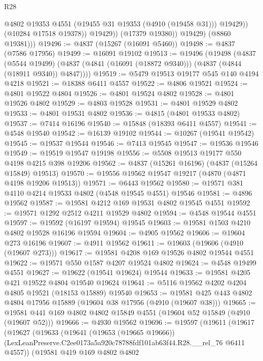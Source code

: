 \begin{lexlean}{R28}
\begin{coremodule}
                      @4802
                      @19353
                      @4551
                      (@19455 @31 @19353 (@4910 (@19458 @31)))
                      @19429))
                  (@10284 @17518 @19378))
                @19429))
            (@17379 @19380))
          @19429)
        (@8860 @19381)))
@19496 := @4837 (@15267 (@16091 @5460))
@19498 := @4837 (@7586 @17956)
@19499 := @16091 @19102
@19513 := @19496
    (@19498
      (@4837
        (@5544 @19499)
        (@4837 (@4841 (@16091 (@18872 @9340))) (@4837 (@4844 (@18911 @9340)) @4847))))
@19519 := @5479 @19513 @19177 @545 @140 @4194 @4218
@19521 := @18388 @6411 @4557
@19522 := @4806 @19521
@19524 := @4801 @19522 @4804
@19526 := @4801 @19524 @4802
@19528 := @4801 @19526 @4802
@19529 := @4803 @19528
@19531 := @4801 @19529 @4802
@19533 := @4801 @19531 @4802
@19536 := @4815 (@4801 @19533 @4802)
@19537 := @7414 @16196
@19540 := @15848 (@18393 @6411 @4557)
@19541 := @4548 @19540
@19542 := @16139 @19102
@19544 := @10267 (@19541 @19542)
@19545 := @19537 @19544
@19546 := @7413 @19545
@19547 := @19536 @19546
@19549 := @19519 @19547 @19198
@19556 := @5508 @19513 @19177 @550 @4198 @4215 @398 @19206
@19562 := @4837 (@15261 @16196) (@4837 (@15264 @15849) @19513)
@19570 := @19556 @19562 @19547 @19217 (@4870 (@4871 @4198 @19206 @19513))
@19571 := @6443 @19562
@19580 := @19571 @381 @4110 @4214 @19533 @4802 (@4548 @19545 @4551) @19546
@19581 := @4896 @19562
@19587 := @19581 @4212 @169 @19531 @4802 @19545 @4551
@19592 := @19571 @1292 @2512 @4211 @19529 @4802
@19594 := @4548 @19544 @4551
@19597 := @19592 (@16197 @19594) @19545
@19603 := @19581 @1503 @4210 @4802 @19528 @16196 @19594
@19604 := @4905 @19562
@19606 := @19604 @273 @16196
@19607 := @4911 @19562
@19611 := @19603 (@19606 (@4910 (@19607 @273)))
@19617 := @19581 @4208 @169 @19526 @4802 @19544 @4551
@19622 := @19571 @550 @1587 @4207 @19524 @4802
@19624 := @4548 @19499 @4551
@19627 := @19622 (@19541 @19624) @19544
@19633 := @19581 @4205 @421 @19522 @4804 @19540 @19624
@19641 := @5116 @19562 @4202 @4204 @4805 @19521 (@18153 @15889) @19540
@19653 := @19581 @425 @443 @4802 @4804 @17956 @15889 (@19604 @38 @17956 (@4910 (@19607 @38)))
@19665 := @19581 @441 @169 @4802 @4802 @15849 @4551 (@19604 @52 @15849 (@4910 (@19607 @52)))
@19666 := @4930 @19562
@19696 := @19597
    (@19611
      (@19617
        (@19627
          (@19633
            (@19641
              (@19653 (@19665 @19666))
              (LexLeanPreserve.C2ee0173a5a920c78788fdf101ab63f44.R28.__rel_76 @6411 @4557))
            (@19581
              @419
              @169
              @4802
              @4802

\end{coremodule}
\end{lexlean}
